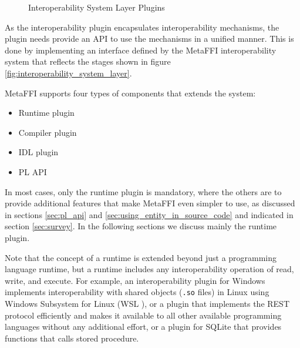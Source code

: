 \documentclass[sigplan,10pt,manuscript,nonacm]{acmart}
\begin{document}
\begin{figure}[!h]
\centering
{}
\caption{Interoperability System Layer Plugins}
\label{fig:interoperability_system_layer_with_plugins}
\end{figure}

As the interoperability plugin encapsulates interoperability mechanisms, the plugin needs provide an API to use the mechanisms in a unified manner. This is done by implementing an interface defined by the MetaFFI interoperability system that reflects the stages shown in figure \ref{fig:interoperability_system_layer}.

MetaFFI supports four types of components that extends the system:
\begin{itemize}
    \item Runtime plugin
    \item Compiler plugin
    \item IDL plugin
    \item PL API
\end{itemize}

In most cases, only the runtime plugin is mandatory, where the others are to provide additional features that make MetaFFI even simpler to use, as discussed in sections \ref{sec:pl_api} and \ref{sec:using_entity_in_source_code} and indicated in section \ref{sec:survey}. In the following sections we discuss mainly the runtime plugin.

Note that the concept of a runtime is extended beyond just a programming language runtime, but a runtime includes any interoperability operation of read, write, and execute. For example, an interoperability plugin for Windows implements interoperability with shared objects (\texttt{.so} files) in Linux using Windows Subsystem for Linux (WSL \cite{wsl}), or a plugin that implements the REST protocol efficiently and makes it available to all other available programming languages without any additional effort, or a plugin for SQLite that provides functions that calls stored procedure.
\end{document}
